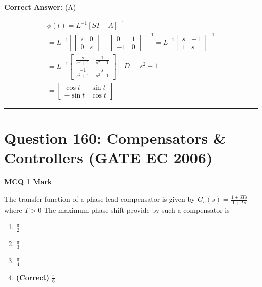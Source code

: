 \documentclass[11pt,a4paper]{article}
\begin{document}
\noindent \textbf{Correct Answer:} (A)

\begin{tcolorbox}[solbox, title=Detailed Solution -- Question 159]
\[
\begin{array}{l} \phi(t)=L^{-1}[S I-A]^{-1} \\ =L^{-1}\left[\left[\begin{array}{ll} s & 0 \\ 0 & s \end{array}\right]-\left[\begin{array}{cc} 0 & 1 \\ -1 & 0 \end{array}\right]\right]^{-1}=L^{-1}\left[\begin{array}{cc} s & -1 \\ 1 & s \end{array}\right]^{-1} \\ =L^{-1}\left[\begin{array}{cc} \frac{s}{s^{2}+1} & \frac{1}{s^{2}+1} \\ \frac{-1}{s^{2}+1} & \frac{s}{s^{2}+1} \end{array}\right]\left[\begin{array}{c} D=s^{2}+1 \\ \end{array}\right] \\ =\left[\begin{array}{cc} \cos t & \sin t \\ -\sin t & \cos t \end{array}\right] \end{array}
\]
\end{tcolorbox}

\vspace{1.5em}
\hrule
\vspace{1.5em}

\section*{Question 160: Compensators \& Controllers (GATE EC 2006)}
\noindent \textbf{\color{primary}MCQ} \hfill \textbf{\color{secondary}1 Mark}


\noindent The transfer function of a phase lead compensator is given by  
$G_{c}(s)=\frac{1+3Ts}{1+Ts}$ where $T > 0$ 
The maximum phase shift provide by such a compensator is


\begin{enumerate}[label=(\Alph*)]
    \item $\frac{\pi }{2}$
    \item $\frac{\pi }{3}$
    \item $\frac{\pi }{4}$
    \item \textbf{(Correct)} $\frac{\pi }{6}$
\end{enumerate}
\end{document}
